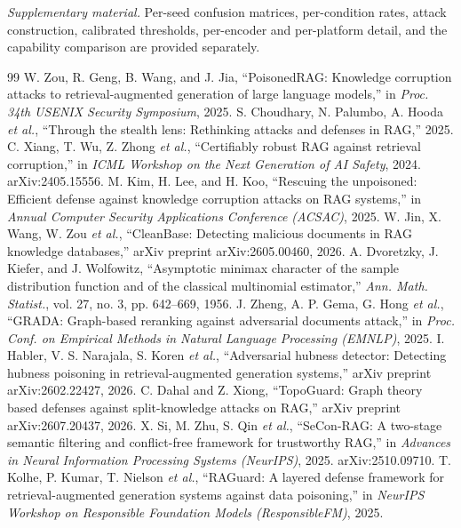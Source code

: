 \documentclass[10pt,journal,compsoc]{IEEEtran}
\begin{document}
\noindent\emph{Supplementary material.} Per-seed confusion matrices, per-condition rates,
attack construction, calibrated thresholds, per-encoder and per-platform detail, and the
capability comparison are provided separately.


\begin{thebibliography}{99}
 W. Zou, R. Geng, B. Wang, and J. Jia, ``PoisonedRAG: Knowledge corruption attacks to retrieval-augmented generation of large language models,'' in \emph{Proc. 34th USENIX Security Symposium}, 2025.
 S. Choudhary, N. Palumbo, A. Hooda \emph{et al.}, ``Through the stealth lens: Rethinking attacks and defenses in RAG,'' 2025.
 C. Xiang, T. Wu, Z. Zhong \emph{et al.}, ``Certifiably robust RAG against retrieval corruption,'' in \emph{ICML Workshop on the Next Generation of AI Safety}, 2024. arXiv:2405.15556.
 M. Kim, H. Lee, and H. Koo, ``Rescuing the unpoisoned: Efficient defense against knowledge corruption attacks on RAG systems,'' in \emph{Annual Computer Security Applications Conference (ACSAC)}, 2025.
 W. Jin, X. Wang, W. Zou \emph{et al.}, ``CleanBase: Detecting malicious documents in RAG knowledge databases,'' arXiv preprint arXiv:2605.00460, 2026.
 A. Dvoretzky, J. Kiefer, and J. Wolfowitz, ``Asymptotic minimax character of the sample distribution function and of the classical multinomial estimator,'' \emph{Ann. Math. Statist.}, vol. 27, no. 3, pp. 642--669, 1956.
 J. Zheng, A. P. Gema, G. Hong \emph{et al.}, ``GRADA: Graph-based reranking against adversarial documents attack,'' in \emph{Proc. Conf. on Empirical Methods in Natural Language Processing (EMNLP)}, 2025.
 I. Habler, V. S. Narajala, S. Koren \emph{et al.}, ``Adversarial hubness detector: Detecting hubness poisoning in retrieval-augmented generation systems,'' arXiv preprint arXiv:2602.22427, 2026.
 C. Dahal and Z. Xiong, ``TopoGuard: Graph theory based defenses against split-knowledge attacks on RAG,'' arXiv preprint arXiv:2607.20437, 2026.
 X. Si, M. Zhu, S. Qin \emph{et al.}, ``SeCon-RAG: A two-stage semantic filtering and conflict-free framework for trustworthy RAG,'' in \emph{Advances in Neural Information Processing Systems (NeurIPS)}, 2025. arXiv:2510.09710.
 T. Kolhe, P. Kumar, T. Nielson \emph{et al.}, ``RAGuard: A layered defense framework for retrieval-augmented generation systems against data poisoning,'' in \emph{NeurIPS Workshop on Responsible Foundation Models (ResponsibleFM)}, 2025.

\end{thebibliography}
\end{document}
